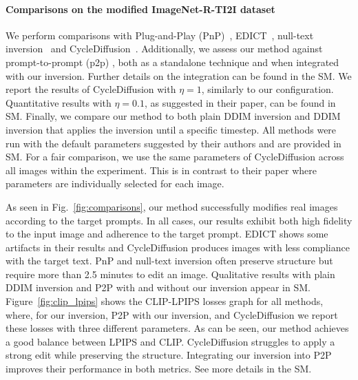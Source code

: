 \paragraph{Comparisons on the modified ImageNet-R-TI2I dataset} 
We perform comparisons with Plug-and-Play (PnP)~\cite{Narek22}, EDICT~\cite{Bram22}, null-text inversion~\cite{Mokady22} and CycleDiffusion~\cite{Wu22}. Additionally, we assess our method against prompt-to-prompt (p2p) \cite{Hertz22}, both as a standalone technique and when integrated with our inversion. Further details on the integration can be found in the SM. We report the results of CycleDiffusion with $\eta=1$, similarly to our configuration. Quantitative results with $\eta=0.1$, as suggested in their paper, can be found in SM. Finally, we compare our method to both plain DDIM inversion and DDIM inversion that applies the inversion until a specific timestep. All methods were run with the default parameters suggested by their authors and are provided in SM. For a fair comparison, we use the same parameters of CycleDiffusion across all images within the experiment. This is in contrast to their paper where parameters are individually selected for each image. 


As seen in Fig.~\ref{fig:comparisons}, our method successfully modifies real images according to the target prompts. In all cases, our results exhibit both high fidelity to the input image and adherence to the target prompt. EDICT shows some artifacts in their results and CycleDiffusion produces images with less compliance with the target text. PnP and null-text inversion often preserve structure but require more than 2.5 minutes to edit an image. Qualitative results with plain DDIM inversion and P2P with and without our inversion appear in SM. Figure~\ref{fig:clip_lpips} shows the CLIP-LPIPS losses graph for all methods, where, for our inversion, P2P with our inversion, and CycleDiffusion we report these losses with three different parameters. As can be seen, our method achieves a good balance between LPIPS and CLIP. CycleDiffusion struggles to apply a strong edit while preserving the structure. Integrating our inversion into P2P improves their performance in both metrics. See more details in the SM.

